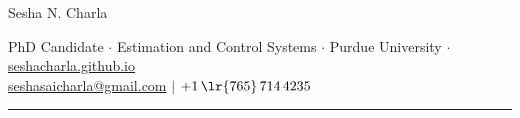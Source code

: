 \documentclass[letterpaper, 10pt]{article}
\begin{document}
\begin{center}
        \huge
        Sesha N. Charla
\end{center}
\begin{center}
        PhD Candidate $\cdot$
        Estimation and Control Systems $\cdot$
        Purdue University $\cdot$
        \href{https://seshacharla.github.io}{seshacharla.github.io}\\
        \href{mailto:seshasaicharla@gmail.com}{seshasaicharla@gmail.com} $|$
        $+1\,\lr{765}\, 714 \, 4235$
\end{center}

\noindent\rule{\textwidth}{0.4pt}


%




\end{document}
